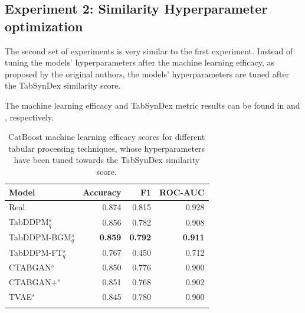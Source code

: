 \subsection{Experiment 2: Similarity Hyperparameter optimization}
\label{ch:Experiment-2}

The second set of experiments is very similar to the first experiment.
Instead of tuning the models' hyperparameters after the machine learning efficacy, as proposed by the original authors,
the models' hyperparameters are tuned after the TabSynDex similarity score.

The machine learning efficacy and TabSynDex metric results can be found in  and , respectively.



\begin{table}[h]
	\centering
	\begin{tabular}{lrrr}
		\toprule
		\textbf{Model}        & \textbf{Accuracy} & \textbf{F1}    & \textbf{ROC-AUC} \\
		\midrule
		Real                  & 0.874              & 0.815          & 0.928            \\
		TabDDPM$^{s}_{q}$     & 0.856              & 0.782          & 0.908            \\
		TabDDPM-BGM$^{s}_{q}$ & \textbf{0.859}     & \textbf{0.792} & \textbf{0.911}   \\
		TabDDPM-FT$^{s}_{q}$  & 0.767              & 0.450          & 0.712            \\
		CTABGAN$^{s}$         & 0.850              & 0.776          & 0.900            \\
		CTABGAN+$^{s}$        & 0.851              & 0.768          & 0.902            \\
		TVAE$^{s}$            & 0.845              & 0.780          & 0.900            \\
		\bottomrule
		\multicolumn{4}{c}{}\\[-0.6em]
	\end{tabular}
	\caption[Experiment 2 ML efficacy]{CatBoost machine learning efficacy scores for different tabular processing techniques, whose hyperparameters have been tuned towards the TabSynDex similarity score.}
	\label{tab:exp2-ml}
\end{table}

